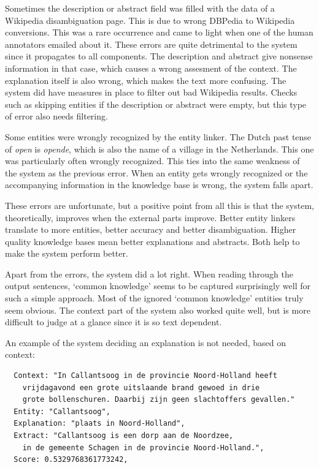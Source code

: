 \documentclass[
10pt, %
a4paper, %
oneside, %
headinclude,footinclude, %
] {book}%
\begin{document}
Sometimes the description or abstract field was filled with the data of a Wikipedia disambiguation page.
This is due to wrong DBPedia to Wikipedia conversions.
This was a rare occurrence and came to light when one of the human annotators emailed about it.
These errors are quite detrimental to the system since it propagates to all components.
The description and abstract give nonsense information in that case, which causes a wrong assesment of the context.
The explanation itself is also wrong, which makes the text more confusing.
The system did have measures in place to filter out bad Wikipedia results.
Checks such as skipping entities if the description or abstract were empty, but this type of error also needs filtering.

Some entities were wrongly recognized by the entity linker.
The Dutch past tense of \textit{open} is \textit{opende}, which is also the name of a village in the Netherlands.
This one was particularly often wrongly recognized.
This ties into the same weakness of the system as the previous error.
When an entity gets wrongly recognized or the accompanying information in the knowledge base is wrong, the system falls apart.

These errors are unfortunate, but a positive point from all this is that the system, theoretically, improves when the external parts improve.
Better entity linkers translate to more entities, better accuracy and better disambiguation.
Higher quality knowledge bases mean better explanations and abstracts.
Both help to make the system perform better.

Apart from the errors, the system did a lot right.
When reading through the output sentences, `common knowledge' seems to be captured surprisingly well for such a simple approach.
Most of the ignored `common knowledge' entities truly seem obvious.
The context part of the system also worked quite well, but is more difficult to judge at a glance since it is so text dependent.

An example of the system deciding an explanation is not needed, based on context:

\newpage

\begin{verbatim}
  Context: "In Callantsoog in de provincie Noord-Holland heeft
    vrijdagavond een grote uitslaande brand gewoed in drie
    grote bollenschuren. Daarbij zijn geen slachtoffers gevallen."
  Entity: "Callantsoog",
  Explanation: "plaats in Noord-Holland",
  Extract: "Callantsoog is een dorp aan de Noordzee,
    in de gemeente Schagen in de provincie Noord-Holland.",
  Score: 0.5329768361773242,
\end{verbatim}
\end{document}
